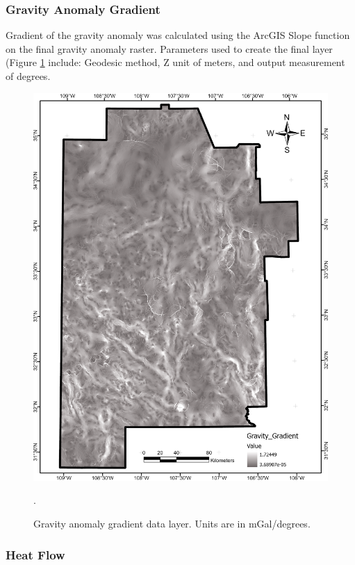 \subsubsection{Gravity Anomaly Gradient}

Gradient of the gravity anomaly was calculated using the ArcGIS Slope function on the final gravity anomaly raster. Parameters used to create the final layer (Figure \ref{fig:feat_gravity_gradient} include: Geodesic method, Z unit of meters, and output measurement of degrees.

\begin{figure}[!htp]
\centering
\includegraphics[scale=.50]{templates/images/Figure-GravityGradient.png}
\caption[Gravity anomaly gradient data layer]{Gravity anomaly gradient data layer. Units are in mGal/degrees.}.
\label{fig:feat_gravity_gradient}
\end{figure}

\subsubsection{Heat Flow}

